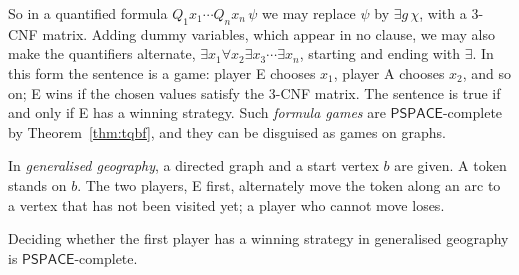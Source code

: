 So in a quantified formula $Q_1x_1\cdots Q_nx_n\,\psi$ we may replace $\psi$ by $\exists g\,\chi$, with a 3-CNF matrix. Adding dummy variables, which appear in no clause, we may also make the quantifiers alternate, $\exists x_1\forall x_2\exists x_3\cdots\exists x_n$, starting and ending with $\exists$. In this form the sentence is a game: player E chooses $x_1$, player A chooses $x_2$, and so on; E wins if the chosen values satisfy the 3-CNF matrix. The sentence is true if and only if E has a winning strategy. Such \emph{formula games} are $\mathsf{PSPACE}$-complete by Theorem~\ref{thm:tqbf}, and they can be disguised as games on graphs.

In \emph{generalised geography}, a directed graph and a start vertex $b$ are given. A token stands on $b$. The two players, E first, alternately move the token along an arc to a vertex that has not been visited yet; a player who cannot move loses.

\begin{theorem}[Schaefer 1978]\label{thm:geography}
Deciding whether the first player has a winning strategy in generalised geography is $\mathsf{PSPACE}$-complete.
\end{theorem}

